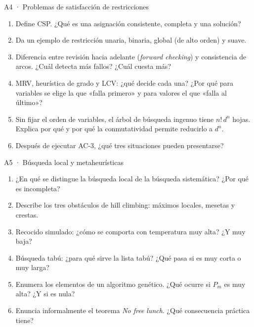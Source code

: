 \begin{ejercicio}{A4 · Problemas de satisfacción de restricciones }
\begin{enumerate}[label=\textbf{\arabic*.}]
\item Define CSP. ¿Qué es una asignación consistente, completa y una solución?
\item Da un ejemplo de restricción unaria, binaria, global (de alto orden) y suave.
\item Diferencia entre revisión hacia adelante (\emph{forward checking}) y consistencia de arcos.
¿Cuál detecta más fallos? ¿Cuál cuesta más?
\item MRV, heurística de grado y LCV: ¿qué decide cada una? ¿Por qué para variables se elige
la que «falla primero» y para valores el que «falla al último»?
\item Sin fijar el orden de variables, el árbol de búsqueda ingenuo tiene $n!\,d^n$ hojas. Explica
por qué y por qué la conmutatividad permite reducirlo a $d^n$.
\item Después de ejecutar AC-3, ¿qué tres situaciones pueden presentarse?
\end{enumerate}
\end{ejercicio}

\begin{ejercicio}{A5 · Búsqueda local y metaheurísticas }
\begin{enumerate}[label=\textbf{\arabic*.}]
\item ¿En qué se distingue la búsqueda local de la búsqueda sistemática? ¿Por qué es incompleta?
\item Describe los tres obstáculos de hill climbing: máximos locales, mesetas y crestas.
\item Recocido simulado: ¿cómo se comporta con temperatura muy alta? ¿Y muy baja?
\item Búsqueda tabú: ¿para qué sirve la lista tabú? ¿Qué pasa si es muy corta o muy larga?
\item Enumera los elementos de un algoritmo genético. ¿Qué ocurre si $P_m$ es muy alta? ¿Y si es nula?
\item Enuncia informalmente el teorema \emph{No free lunch}. ¿Qué consecuencia práctica tiene?
\end{enumerate}
\end{ejercicio}

